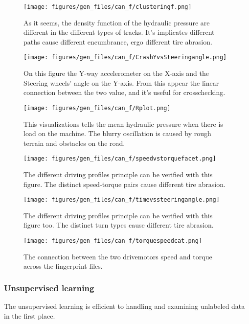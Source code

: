 		\begin{figure}[H]
			\centering
			\texttt{[image: figures/gen\_files/can\_f/clusteringf.png]}
			\caption{As it seems, the density function of the hydraulic pressure are different in the different types of tracks. It's implicates different paths cause different encumbrance, ergo different tire abrasion.} 
			\end{figure}
		\begin{figure}[H]
			\centering
			\texttt{[image: figures/gen\_files/can\_f/CrashYvsSteeringangle.png]}
			\caption{On this figure the Y-way accelerometer on the X-axis and the Steering wheels' angle on the Y-axis. From this appear the linear connection between the two value, and it's useful for crosschecking.} 
			\end{figure}
		\begin{figure}[H]
			\centering
			\texttt{[image: figures/gen\_files/can\_f/Rplot.png]}
			\caption{This visualizations tells the mean hydraulic pressure when there is load on the machine. The blurry oscillation is caused by rough terrain and obstacles on the road.} 
			\end{figure}		
		\begin{figure}[H]
			\centering
			\texttt{[image: figures/gen\_files/can\_f/speedvstorquefacet.png]}
			\caption{The different driving profiles principle can be verified with this figure. The distinct speed-torque pairs cause different tire abrasion.} 
			\end{figure}	
		\begin{figure}[H]
			\centering
			\texttt{[image: figures/gen\_files/can\_f/timevssteeringangle.png]}
			\caption{The different driving profiles principle can be verified with this figure too. The distinct turn types cause different tire abrasion.} 
			\end{figure}	
		\begin{figure}[H]
			\centering
			\texttt{[image: figures/gen\_files/can\_f/torquespeedcat.png]}
			\caption{The connection between the two drivemotors speed and torque across the fingerprint files.} 
			\end{figure}		
	\subsubsection{Unsupervised learning}
	The unsupervised learning is efficient to handling and examining unlabeled data in the first place.
	
